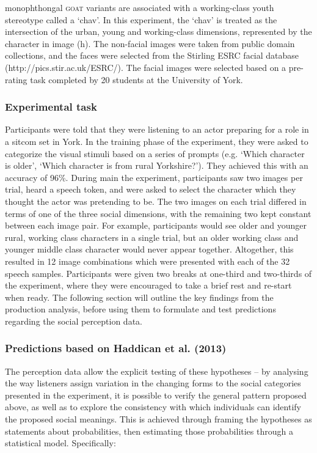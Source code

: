 \documentclass[PWPL]{article}
\begin{document}
 monophthongal \textsc{goat} variants are associated with a working-class youth stereotype called a `chav'. In this experiment, the `chav' is treated as the intersection of the urban, young and working-class dimensions, represented by the character in image (h). The non-facial images were taken from public domain collections, and the faces were selected from the Stirling ESRC facial database (http://pics.stir.ac.uk/ESRC/). The facial images were selected based on a pre-rating task completed by 20 students at the University of York. 
\subsubsection{Experimental task}

Participants were told that they were listening to an actor preparing for a role in a sitcom set in York. In the training phase of the experiment, they were asked to categorize the visual stimuli based on a series of prompts (e.g. `Which character is older', `Which character is from rural Yorkshire?'). They achieved this with an accuracy of 96\%. During main the experiment, participants saw two images per trial, heard a speech token, and were asked to select the character which they thought the actor was pretending to be. The two images on each trial differed in terms of one of the three social dimensions, with the remaining two kept constant between each image pair. For example, participants would see older and younger rural, working class characters in a single trial, but an older working class and younger middle class character would never appear together. Altogether, this resulted in 12 image combinations which were presented with each of the 32 speech samples. Participants were given two breaks at one-third and two-thirds of the experiment, where they were encouraged to take a brief rest and re-start when ready. The following section will outline the key findings from the production analysis, before using them to formulate and test predictions regarding the social perception data.


\subsubsection{Predictions based on Haddican et al. (2013)}

The perception data allow the explicit testing of these hypotheses -- by analysing the way listeners assign variation in the changing forms to the social categories presented in the experiment, it is possible to verify the general pattern proposed above, as well as to explore the consistency with which individuals can identify the proposed social meanings. This is achieved through framing the hypotheses as statements about probabilities, then estimating those probabilities through a statistical model. Specifically:
\end{document}
